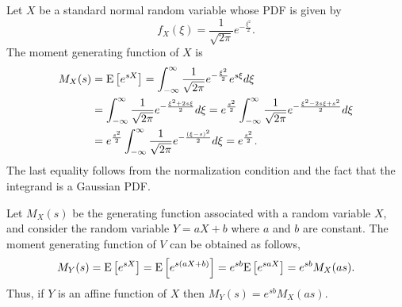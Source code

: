 \begin{example}
Let $X$ be a standard normal random variable whose PDF is given by
\begin{equation*}
f_X (\xi) = \frac{1}{\sqrt{2 \pi}} e^{- \frac{\xi^2}{2}}.
\end{equation*}
The moment generating function of $X$ is
\begin{equation*}
\begin{split}
M_X (s) &= \mathrm{E} \left[ e^{sX} \right]
= \int_{- \infty}^{\infty} \frac{1}{\sqrt{2 \pi}} e^{- \frac{\xi^2}{2}} e^{s\xi} d\xi \\
&= \int_{- \infty}^{\infty} \frac{1}{\sqrt{2 \pi}} e^{- \frac{\xi^2 + 2 s \xi}{2}} d\xi
= e^{\frac{s^2}{2}} \int_{- \infty}^{\infty}
\frac{1}{\sqrt{2 \pi}} e^{- \frac{\xi^2 - 2 s \xi + s^2}{2}} d\xi \\
&= e^{\frac{s^2}{2}} \int_{- \infty}^{\infty}
\frac{1}{\sqrt{2 \pi}} e^{- \frac{(\xi - s)^2}{2}} d\xi
= e^{\frac{s^2}{2}} .
\end{split}
\end{equation*}
The last equality follows from the normalization condition and the fact that the integrand is a Gaussian PDF.
\end{example}

Let $M_X(s)$ be the generating function associated with a random variable $X$, and consider the random variable $Y = aX + b$ where $a$ and $b$ are constant.
The moment generating function of $V$ can be obtained as follows,
\begin{equation*}
M_Y (s) = \mathrm{E} \left[ e^{s X} \right]
= \mathrm{E} \left[ e^{s (aX + b)} \right]
= e^{sb} \mathrm{E} \left[ e^{saX} \right]
= e^{sb} M_X (as) .
\end{equation*}
Thus, if $Y$ is an affine function of $X$ then $M_Y (s) = e^{sb} M_X (as)$.

